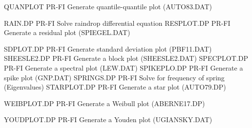 QUANPLOT                    PR-FI Generate quantile-quantile plot (AUTO83.DAT)

RAIN.DP                     PR-FI Solve raindrop differential equation 
RESPLOT.DP                  PR-FI Generate a residual plot (SPIEGEL.DAT)

SDPLOT.DP                   PR-FI Generate standard deviation plot (PBF11.DAT)
SHEESLE2.DP                 PR-FI Generate a block plot (SHEESLE2.DAT)
SPECPLOT.DP                 PR-FI Generate a spectral plot (LEW.DAT)
SPIKEPLO.DP                 PR-FI Generate a spike plot (GNP.DAT)
SPRINGS.DP                  PR-FI Solve for frequency of spring (Eigenvalues)
STARPLOT.DP                 PR-FI Generate a star plot (AUTO79.DP)

WEIBPLOT.DP                 PR-FI Generate a Weibull plot (ABERNE17.DP)

YOUDPLOT.DP                 PR-FI Generate a Youden plot (UGIANSKY.DAT)

